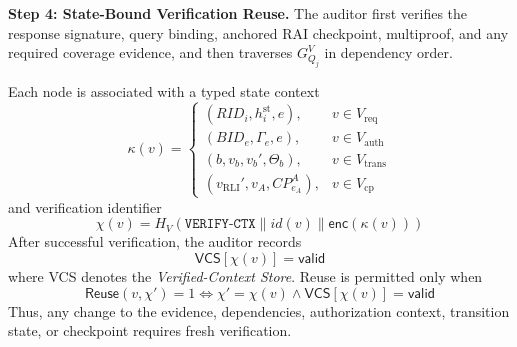 \documentclass[lettersize,journal]{IEEEtran}
\begin{document}
\medskip
\noindent\textbf{Step 4: State-Bound Verification Reuse.}
The auditor first verifies the response signature, query binding,
anchored RAI checkpoint, multiproof, and any required coverage
evidence, and then traverses $G_{Q_j}^{V}$ in dependency order.

Each node is associated with a typed state context
\begin{equation}
\kappa(v)=
\begin{cases}
(RID_i,h_i^{\mathrm{st}},e),
&v\in V_{\mathrm{req}}\\
(BID_e,\Gamma_e,e),
&v\in V_{\mathrm{auth}}\\
(b,v_b,v_b',\Theta_b),
&v\in V_{\mathrm{trans}}\\
(v_{\mathrm{RLI}}',v_A,CP_{e_A}^A),
&v\in V_{\mathrm{cp}}
\end{cases}
\end{equation}
and verification identifier
\begin{equation}
\chi(v)=
H_V(
\texttt{VERIFY-CTX}\parallel
id(v)\parallel\mathsf{enc}(\kappa(v)))
\label{eq:chi}
\end{equation}
After successful verification, the auditor records
\begin{equation}
\mathsf{VCS}[\chi(v)]=\mathsf{valid}
\end{equation}
where VCS denotes the \emph{Verified-Context Store}. Reuse is permitted
only when
\begin{equation}
\mathsf{Reuse}(v,\chi')
=1
\Longleftrightarrow
\chi'=\chi(v)
\land
\mathsf{VCS}[\chi(v)]=\mathsf{valid}
\label{eq:saver_reuse}
\end{equation}
Thus, any change to the evidence, dependencies, authorization context,
transition state, or checkpoint requires fresh verification.
\end{document}
